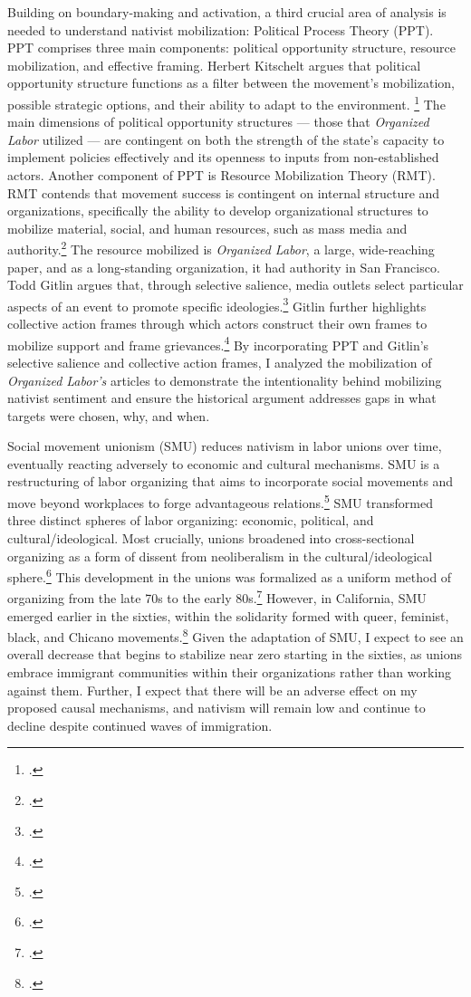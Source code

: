 \documentclass[12pt,a4paper]{article}
\begin{document}
Building on boundary-making and activation, a third crucial area of analysis is needed to understand nativist mobilization: Political Process Theory (PPT). PPT comprises three main components: political opportunity structure, resource mobilization, and effective framing. Herbert Kitschelt argues that political opportunity structure functions as a filter between the movement's mobilization, possible strategic options, and their ability to adapt to the environment. \footcite{kitschelt_political_1986} The main dimensions of political opportunity structures — those that \textit{Organized Labor} utilized — are contingent on both the strength of the state's capacity to implement policies effectively and its openness to inputs from non-established actors. Another component of PPT is Resource Mobilization Theory (RMT). RMT contends that movement success is contingent on internal structure and organizations, specifically the ability to develop organizational structures to mobilize material, social, and human resources, such as mass media and authority.\footcite{mccarthy_resource_1977} The resource mobilized is \textit{Organized Labor}, a large, wide-reaching paper, and as a long-standing organization, it had authority in San Francisco. Todd Gitlin argues that, through selective salience, media outlets select particular aspects of an event to promote specific ideologies.\footcite{gitlin_whole_1980} Gitlin further highlights collective action frames through which actors construct their own frames to mobilize support and frame grievances.\footcite{gitlin_whole_1980} By incorporating PPT and Gitlin's selective salience and collective action frames, I analyzed the mobilization of \textit{Organized Labor’s} articles to demonstrate the intentionality behind mobilizing nativist sentiment and ensure the historical argument addresses gaps in what targets were chosen, why, and when.

Social movement unionism (SMU) reduces nativism in labor unions over time, eventually reacting adversely to economic and cultural mechanisms. SMU is a restructuring of labor organizing that aims to incorporate social movements and move beyond workplaces to forge advantageous relations.\footcites{yamada_what_2008}{walsh_new_2012} SMU transformed three distinct spheres of labor organizing: economic, political, and cultural/ideological. Most crucially, unions broadened into cross-sectional organizing as a form of dissent from neoliberalism in the cultural/ideological sphere.\footcite{yamada_what_2008} This development in the unions was formalized as a uniform method of organizing from the late 70s to the early 80s.\footcite{walsh_new_2012} However, in California, SMU emerged earlier in the sixties, within the solidarity formed with queer, feminist, black, and Chicano movements.\footcite{hobson_lavender_2016} Given the adaptation of SMU, I expect to see an overall decrease that begins to stabilize near zero starting in the sixties, as unions embrace immigrant communities within their organizations rather than working against them. Further, I expect that there will be an adverse effect on my proposed causal mechanisms, and nativism will remain low and continue to decline despite continued waves of immigration.
\end{document}
